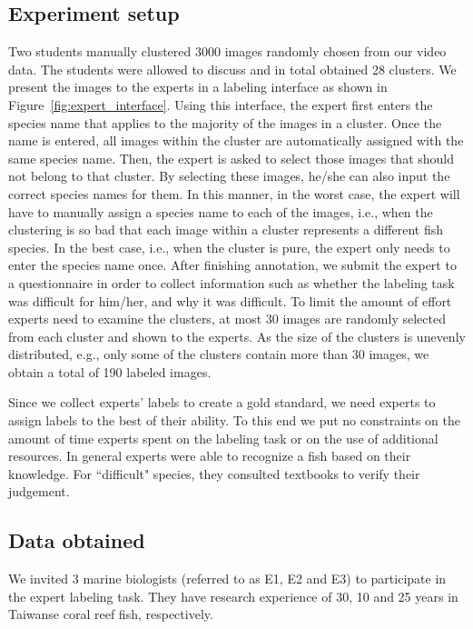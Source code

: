 \subsection{Experiment setup}
%
Two students manually clustered 3000 images randomly chosen from our
video data. The students were allowed to discuss and in total obtained
28 clusters. We present the images to the experts in a labeling
interface as shown in Figure~\ref{fig:expert_interface}. 
%
Using this interface, the expert first enters the species name that
applies to the majority of the images in a cluster. 
Once the name is entered, all images within the cluster are
automatically assigned with the same species name. Then, the expert is
asked to select those images that should not belong to that cluster.
By selecting these images, he/she can also input the correct species
names for them. 
In this manner, in the worst case, the expert will have to manually
assign a species name to each of the images, i.e., when the clustering
is so bad that each image within a cluster represents a different fish
species. In the best case, i.e., when the cluster is pure, the expert
only needs to enter the species name once.
%
After finishing annotation, we submit the expert to a questionnaire in
order to collect information such as whether the labeling task was
difficult for him/her, and why it was difficult. 
%
To limit the amount of effort experts need to examine the clusters, at
most 30 images are randomly selected from each cluster and shown to
the experts. As the size of the clusters is unevenly distributed,
e.g., only some of the clusters contain more than 30 images, we obtain
a total of 190 labeled images.

Since we collect experts' labels to create a gold standard, we need
experts to assign labels to the best of their ability. To this end we
put no constraints on the amount of time experts spent on the labeling
task or on the use of additional resources. In general experts were
able to recognize a fish based on their knowledge. For ``difficult"
species, they consulted textbooks to verify their judgement.  

\subsection{Data obtained}
We invited 3 marine biologists (referred to as E1, E2 and E3) to
participate in the expert labeling task. They have research experience
of 30, 10 and 25 years in Taiwanse coral reef fish, respectively. 
  
